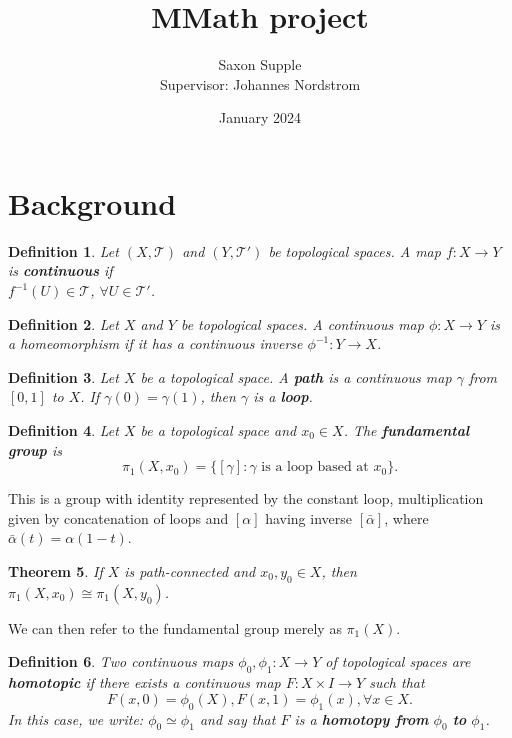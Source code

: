 \documentclass{article}
\title{MMath project}
\author{Saxon Supple\\Supervisor: Johannes Nordstrom}
\date{January 2024}
\newtheorem{theorem}{Theorem}[section]
\newtheorem{definition}[theorem]{Definition}
\begin{document}
\maketitle

\section{Background}

\begin{definition}
Let $(X,\mathcal{T})$ and $(Y,\mathcal{T}')$ be topological spaces. A map $f\colon X\to Y$ is \textbf{continuous} if\\
$f^{-1}(U)\in\mathcal{T}$, $\forall U\in\mathcal{T}'$.
\end{definition}

\begin{definition}
Let $X$ and $Y$ be topological spaces. A continuous map $\phi\colon X\to Y$ is a homeomorphism if it has a continuous inverse $\phi^{-1}\colon Y\to X$.
\end{definition}

\begin{definition}
Let $X$ be a topological space. A \textbf{path} is a continuous map $\gamma$ from $[0,1]$ to $X$. If $\gamma(0)=\gamma(1)$, then $\gamma$ is a \textbf{loop}.
\end{definition}

\begin{definition}
Let $X$ be a topological space and $x_0\in X$. The \textbf{fundamental group} is \[\pi_1(X,x_0)=\{[\gamma]:\gamma\text{ is a loop based at }x_0\}.\]
\end{definition}
This is a group with identity represented by the constant loop, multiplication given by concatenation of loops and $[\alpha]$ having inverse $[\bar \alpha]$, where $\bar \alpha(t)=\alpha(1-t)$.

\begin{theorem}
If $X$ is path-connected and $x_0,y_0\in X$, then $\pi_1(X,x_0)\cong\pi_1(X,y_0)$.
\end{theorem}
We can then refer to the fundamental group merely as $\pi_1(X)$.

\begin{definition}
Two continuous maps $\phi_0,\phi_1\colon X\to Y$ of topological spaces are \textbf{homotopic} if there exists a continuous map $F\colon X\times I\to Y$ such that\[F(x,0)=\phi_0(X), F(x,1)=\phi_1(x),\forall x\in X.\]
In this case, we write: $\phi_0\simeq\phi_1$ and say that $F$ is a \textbf{homotopy from} $\phi_0$ \textbf{to} $\phi_1$.
\end{definition}
\end{document}
